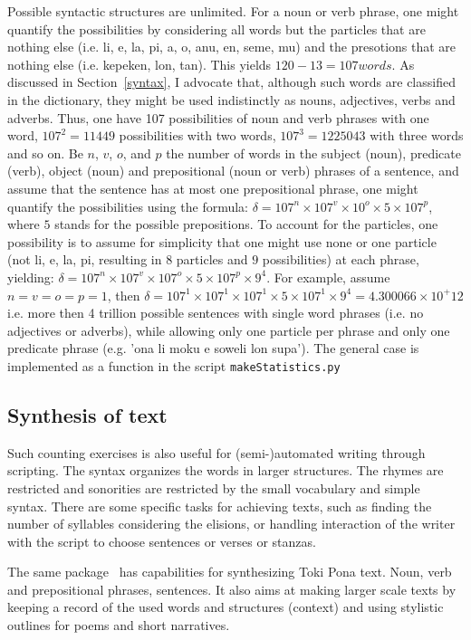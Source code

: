 \documentclass{article}
\newcommand{\tttt}[1]{\texttt{#1}}
\begin{document}
Possible syntactic structures are unlimited.
For a noun or verb phrase, one might quantify the possibilities
by considering all words but the particles that are nothing else
(i.e. li, e, la, pi, a, o, anu, en, seme, mu)
and the presotions that are nothing else (i.e. kepeken, lon, tan).
This yields $120-13=107 words$.
As discussed in Section~\ref{syntax},
I advocate that, although such words are classified in the dictionary,
they might be used indistinctly as nouns, adjectives,
verbs and adverbs.
Thus, one have 107 possibilities of noun and verb phrases with
one word, $107^2=11449$ possibilities with two words,
$107^3=1225043$ with three words and so on.
Be $n$, $v$, $o$, and $p$ the number of words in the subject (noun), predicate
(verb), object (noun) and prepositional (noun or verb) phrases of a sentence,
and assume that the sentence has at most one prepositional phrase,
one might quantify the possibilities using the formula:
$\delta = 107^n\times 107^v\times 10^o \times 5\times 107^p$,
where $5$ stands for the possible prepositions.
To account for the particles, one possibility is
to assume for simplicity that one might use none or one particle
(not li, e, la, pi, resulting in $8$ particles and $9$ possibilities)
at each phrase, yielding:
$\delta = 107^n\times 107^v\times 107^o \times 5\times 107^p\times 9^4$.
For example, assume $n=v=o=p=1$, then
$\delta=107^1\times 107^1\times 107^1 \times 5\times 107^1\times 9^4=
 4.300066\times 10^+12$
i.e. more then 4 trillion possible
sentences with single word phrases (i.e. no adjectives or adverbs),
while allowing only one particle per phrase
and only one predicate phrase 
(e.g. 'ona li moku e soweli lon supa').
The general case is implemented as a function
in the script \tttt{makeStatistics.py}~\cite{tokipona}

\subsection{Synthesis of text}\label{synth}
Such counting exercises is also useful
for (semi-)automated writing through scripting.
The syntax organizes the words in larger structures.
The rhymes are restricted and sonorities are
restricted by the small vocabulary and simple syntax.
There are some specific tasks for achieving texts,
such as finding the number of syllables considering the elisions,
or handling interaction of the writer with the script
to choose sentences or verses or stanzas.

The same package~\cite{tokipona}
has capabilities for synthesizing Toki Pona text.
Noun, verb and prepositional phrases,
sentences.
It also aims at making larger scale texts
by keeping a record of the used words and structures (context)
and using stylistic outlines for poems and short narratives.
\end{document}
